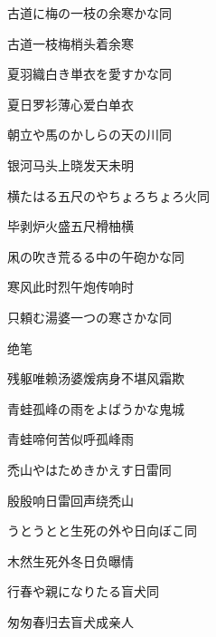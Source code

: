\begin{haiku}
    {\FH 古道に梅の一枝の余寒かな}\hfill{\FH 同}

    {\FK 古道一枝梅梢头着余寒}
\end{haiku}

\begin{haiku}
    {\FH 夏羽織白き単衣を愛すかな}\hfill{\FH 同}

    {\FK 夏日罗衫薄心爱白单衣}
\end{haiku}

\begin{haiku}
    {\FH 朝立や馬のかしらの天の川}\hfill{\FH 同}

    {\FK 银河马头上晓发天未明}
\end{haiku}

\begin{haiku}
    {\FH 横たはる五尺のやちょろちょろ火}\hfill{\FH 同}

    {\FK 毕剥炉火盛五尺榾柚横}
\end{haiku}

\begin{haiku}
    {\FH 凩の吹き荒るる中の午砲かな}\hfill{\FH 同}

    {\FK 寒风此时烈午炮传响时}
\end{haiku}

\begin{haiku}
    {\FH 只頼む湯婆一つの寒さかな}\hfill{\FH 同}

    {\FK 绝笔}

    {\FK 残躯唯赖汤婆煖病身不堪风霜欺}
\end{haiku}

\begin{haiku}
    {\FH 青蛙孤峰の雨をよばうかな}\hfill{\FH 鬼城}

    {\FK 青蛙啼何苦似呼孤峰雨}
\end{haiku}

\begin{haiku}
    {\FH 禿山やはためきかえす日雷}\hfill{\FH 同}

    {\FK 殷殷响日雷回声绕秃山}
\end{haiku}

\begin{haiku}
    {\FH うとうとと生死の外や日向ぼこ}\hfill{\FH 同}

    {\FK 木然生死外冬日负曝情}
\end{haiku}

\begin{haiku}
    {\FH 行春や親になりたる盲犬}\hfill{\FH 同}

    {\FK 匆匆春归去盲犬成亲人}
\end{haiku}

